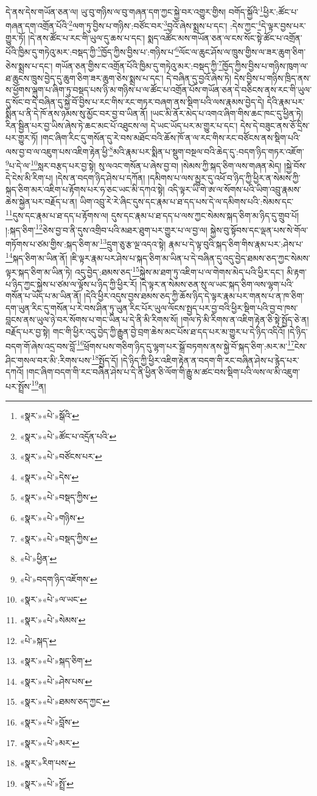 དེ་ནས་དེས་གཡོན་ཅན་ལ། ཡུ་བུ་གཉིས་ལ་བུ་གཞན་དག་ཀྱང་སྐྱེ་བར་འགྱུར་གྱིས། བགོད་སྐྱོའི་\footnote{«སྣར་»«པེ་»སྒོའི་}ཕྱིར་:ཚོང་པ་གཞན་དག་འགྲོན་པོའི་\footnote{«སྣར་»«པེ་»ཚོང་པ་འདྲོན་པའི་}ལག་ཏུ་བྱིས་པ་གཉིས་:བཙོང་བར་\footnote{«སྣར་»«པེ་»བཙོངས་པར་}བྱའོ་ཞེས་སྨྲས་པ་དང་། :དེས་ཀྱང་\footnote{«སྣར་»«པེ་»དེས་}དེ་ལྟར་བྱས་པར་གྱུར་ཏོ། །དེ་ནས་ཚོང་པ་རང་གི་ཡུལ་དུ་ཆས་པ་དང་། སྨད་འཚོང་མས་གཡོན་ཅན་ལ་ངས་སོང་སྟེ་ཚོང་པ་འགྲོན་པོའི་ཁྱིམ་དུ་གཏེའུ་མར་:བསྡད་ཀྱི་\footnote{«སྣར་»«པེ་»བསྡད་ཀྱིས་}ཁྱོད་ཀྱིས་བྱིས་པ་:གཉིས་པ་\footnote{«སྣར་»«པེ་»གཉིས་}ལོང་ལ་ཆུང་ཤོས་ལ་ཁྲུས་གྱིས་ལ་ཟར་ཆུག་ཅིག་ཅེས་སྨྲས་པ་དང་། གཡོན་ཅན་གྱིས་ང་འགྲོན་པོའི་ཁྱིམ་དུ་གཏེའུ་མར་:བསྡད་ཀྱི་\footnote{«སྣར་»«པེ་»བསྡད་ཀྱིས་}ཁྱོད་ཀྱིས་བྱིས་པ་གཉིས་ཁུག་ལ་ཐ་ཆུངས་ཁྲུས་བྱེད་དུ་ཆུག་ཅིག་ཟར་ཆུག་ཅེས་སྨྲས་པ་དང་། དེ་བཞིན་དུ་བྱའོ་ཞེས་ཏེ། དེས་བྱིས་པ་གཉིས་ཁྲིད་ནས་ས་ཕྱོགས་ལྐུག་པ་ཞིག་ཏུ་བསྡད་པས་ཉི་མ་གཉིས་པ་ལ་ཚོང་པ་འགྲོན་པོས་གཡོན་ཅན་དེ་བཅིངས་ནས་རང་གི་ཡུལ་དུ་སོང་བ་དེ་བཞིན་དུ་སྐྱེ་བོ་བྱིས་པ་རང་གིས་རང་གཏར་བཞག་ནས་སྡིག་པའི་ལས་རྣམས་བྱེད་དེ། དེའི་རྣམ་པར་སྨིན་པ་ནི་དེ་ཁོ་ནས་ཉམས་སུ་མྱོང་བར་བྱ་བ་ཡིན་ནོ། །ཡང་མི་ནོར་མེད་པ་འགའ་ཞིག་གིས་ཆང་ཁང་དུ་ཕྱིན་ཏེ། རིན་སྦྱིན་པར་བྱ་ཡིས་ཞེས་ཏེ་ཆང་མང་པོ་འཐུངས་ལ། དེ་ཡང་ཡོད་པར་མ་གྱུར་པ་དང་། དེས་དེ་བཟུང་ནས་ཅོ་དྲིས་པར་གྱུར་ཏོ། །གང་ཞིག་རིང་དུ་གསོན་དུ་རེ་བས་མཐོང་བའི་ཆོས་ཁོ་ན་ལ་རང་གིས་རང་བཙོངས་ནས་སྡིག་པའི་ལས་བྱ་བ་ལ་འཇུག་པས་འཇིག་རྟེན་ཕྱི་\footnote{«པེ་»ཕྱིན་}མའི་རྣམ་པར་སྨིན་པ་སྡུག་བསྔལ་བའི་ཆེད་དུ་:བདག་ཉིད་གཏར་འཇོག་\footnote{«པེ་»བདག་ཉིད་འཇོགས་}པ་དེ་ལ་\footnote{«སྣར་»«པེ་»ལ་ཡང་}སླར་བརྩད་པར་བྱ་སྟེ། སུ་ལའང་གསོན་པ་ཞེས་བྱ་བ། །སེམས་ཀྱི་སྐད་ཅིག་ལས་གཞན་མེད། །སྐྱེ་བོས་དེ་ངེས་མི་རིག་པ། །དེས་ན་བདག་ཉིད་ཤེས་པ་དཀོན། །དམིགས་པ་ལས་མྱུར་དུ་འཕོ་བ་ཉིད་ཀྱི་ཕྱིར་ན་སེམས་ཀྱི་སྐད་ཅིག་མར་འཇིག་པ་རྟོགས་པར་ཧ་ཅང་ཡང་མི་དཀའ་སྟེ། འདི་ལྟར་ཡི་གེ་ཨ་ལ་སོགས་པའི་ཡིག་འབྲུ་རྣམས་ཆེས་སྐྱེན་པར་བརྗོད་པ་ན། ཡིག་འབྲུ་རེ་རེ་ཞིང་དུས་དང་རྣམ་པ་ཐ་དད་པས་དེ་ལ་དམིགས་པའི་:སེམས་དང་\footnote{«སྣར་»«པེ་»སེམས་}དུས་དང་རྣམ་པ་ཐ་དད་པ་རྟོགས་ལ། དུས་དང་རྣམ་པ་ཐ་དད་པ་ལས་ཀྱང་སེམས་སྐད་ཅིག་མ་ཉིད་དུ་གྲུབ་པོ། །:སྐད་ཅིག་\footnote{«པེ་»སྐད་}ཅེས་བྱ་བ་ནི་དུས་འགྲིབ་པའི་མཐར་ཐུག་པར་གྱུར་པ་ལ་བྱ་ལ། སྐྱེས་བུ་སྟོབས་དང་ལྡན་པས་སེ་གོལ་གཏོགས་པ་ཙམ་གྱིས་:སྐད་ཅིག་མ་\footnote{«སྣར་»«པེ་»སྐད་ཅིག་}དྲུག་ཅུ་རྩ་ལྔ་འདའ་སྟེ། རྣམ་པ་དེ་ལྟ་བུའི་སྐད་ཅིག་གིས་རྣམ་པར་:ཤེས་པ་\footnote{«སྣར་»«པེ་»ཤེས་པས་}སྐད་ཅིག་མ་ཡིན་ནོ། །ཇི་ལྟར་རྣམ་པར་ཤེས་པ་སྐད་ཅིག་མ་ཡིན་པ་དེ་བཞིན་དུ་འདུ་བྱེད་ཐམས་ཅད་ཀྱང་སེམས་ལྟར་སྐད་ཅིག་མ་ཡིན་ཏེ། འདུ་བྱེད་:ཐམས་ཅད་\footnote{«སྣར་»«པེ་»ཐམས་ཅད་ཀྱང་}སྐྱེས་མ་ཐག་ཏུ་འཇིག་པ་ལ་གེགས་མེད་པའི་ཕྱིར་དང་། མི་རྟག་པ་ཉིད་ཀྱང་སྐྱེས་པ་ཙམ་ལ་ལྟོས་པ་ཉིད་ཀྱི་ཕྱིར་རོ། །དེ་ལྟར་ན་སེམས་ཅན་སུ་ལ་ཡང་སྐད་ཅིག་ལས་ལྷག་པའི་གསོན་པ་ཡོད་པ་མ་ཡིན་ནོ། །དེའི་ཕྱིར་འདུས་བྱས་ཐམས་ཅད་ཀྱི་ཆོས་ཉིད་དེ་ལྟར་རྣམ་པར་གནས་པ་ན་ཁ་ཅིག་དག་ཡུན་རིང་དུ་གསོན་པ་རེ་བས་ཤིན་ཏུ་ཡུན་རིང་པོར་ཡུལ་ལོངས་སྤྱད་པར་བྱ་བའི་ཕྱིར་སྡིག་པའི་བྱ་བ་ཁས་བླངས་ནས་ཡུལ་ཉེ་བར་སོགས་པ་གང་ཡིན་པ་དེ་ནི་མི་རིགས་སོ། །གལ་ཏེ་མི་རིགས་ན་འཇིག་རྟེན་ཅི་སྟེ་སྤྱོད་ཅེ་ན། བརྗོད་པར་བྱ་སྟེ། གང་གི་ཕྱིར་འདུ་བྱེད་ཀྱི་རྒྱུན་བྱེ་བྲག་ཆེས་མང་པོས་ཐ་དད་པར་མ་གྱུར་པ་དེ་ཉིད་འདིའོ། །དེ་ཉིད་བདག་གོ་ཞེས་འདྲ་བས་བློ་\footnote{«སྣར་»«པེ་»བློས་}ཕྲོགས་པས་གཅིག་ཉིད་དུ་ལྷག་པར་སྒྲོ་བཏགས་ནས་སྐྱེ་བོ་སྐད་ཅིག་:མར་མ་\footnote{«སྣར་»«པེ་»མར་}ངེས་ཤིང་གསལ་བར་མི་:རིགས་པས་\footnote{«སྣར་»རིག་པས་}སྤྱོད་དོ། །དེ་ཉིད་ཀྱི་ཕྱིར་འཇིག་རྟེན་ན་བདག་གི་རང་བཞིན་ཤེས་པ་རྙེད་པར་དཀའོ། །གང་ཞིག་བདག་གི་རང་བཞིན་ཤེས་པ་དེ་ནི་ཕྱིན་ཅི་ལོག་གི་རྒྱུ་མ་ཚང་བས་སྡིག་པའི་ལས་ལ་མི་འཇུག་པར་སྤྲོས་\footnote{«སྣར་»«པེ་»སྤྲོ་}ན། 